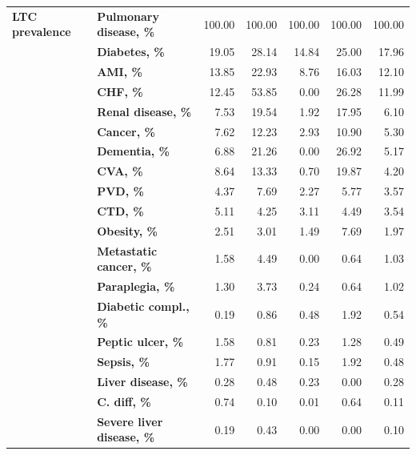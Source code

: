 \begin{table}
{\begin{tabular}{llrrrrr}
        \textbf{LTC prevalence} & \textbf{Pulmonary disease, \%} &   100.00 &   100.00 &   100.00 &    100.00 &     100.00 \\
               & \textbf{Diabetes, \%} &    19.05 &    28.14 &    14.84 &     25.00 &      17.96 \\
               & \textbf{AMI, \%} &    13.85 &    22.93 &     8.76 &     16.03 &      12.10 \\
               & \textbf{CHF, \%} &    12.45 &    53.85 &     0.00 &     26.28 &      11.99 \\
               & \textbf{Renal disease, \%} &     7.53 &    19.54 &     1.92 &     17.95 &       6.10 \\
               & \textbf{Cancer, \%} &     7.62 &    12.23 &     2.93 &     10.90 &       5.30 \\
               & \textbf{Dementia, \%} &     6.88 &    21.26 &     0.00 &     26.92 &       5.17 \\
               & \textbf{CVA, \%} &     8.64 &    13.33 &     0.70 &     19.87 &       4.20 \\
               & \textbf{PVD, \%} &     4.37 &     7.69 &     2.27 &      5.77 &       3.57 \\
               & \textbf{CTD, \%} &     5.11 &     4.25 &     3.11 &      4.49 &       3.54 \\
               & \textbf{Obesity, \%} &     2.51 &     3.01 &     1.49 &      7.69 &       1.97 \\
               & \textbf{Metastatic cancer, \%} &     1.58 &     4.49 &     0.00 &      0.64 &       1.03 \\
               & \textbf{Paraplegia, \%} &     1.30 &     3.73 &     0.24 &      0.64 &       1.02 \\
               & \textbf{Diabetic compl., \%} &     0.19 &     0.86 &     0.48 &      1.92 &       0.54 \\
               & \textbf{Peptic ulcer, \%} &     1.58 &     0.81 &     0.23 &      1.28 &       0.49 \\
               & \textbf{Sepsis, \%} &     1.77 &     0.91 &     0.15 &      1.92 &       0.48 \\
               & \textbf{Liver disease, \%} &     0.28 &     0.48 &     0.23 &      0.00 &       0.28 \\
               & \textbf{C. diff, \%} &     0.74 &     0.10 &     0.01 &      0.64 &       0.11 \\
               & \textbf{Severe liver disease, \%} &     0.19 &     0.43 &     0.00 &      0.00 &       0.10 \\

\end{tabular}}
\end{table}
